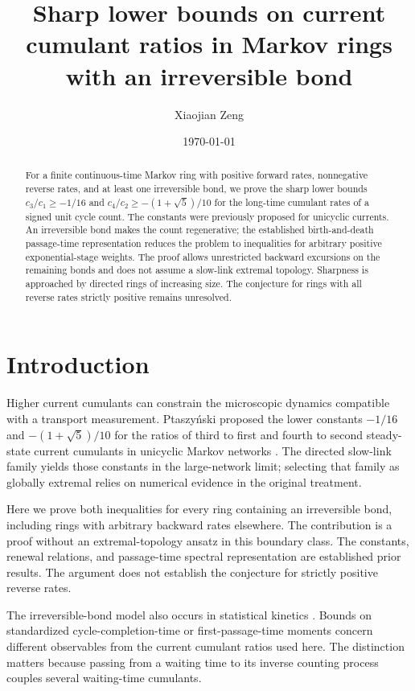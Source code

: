 \documentclass[aps,pre,preprint,superscriptaddress,nofootinbib]{revtex4-2}
\begin{document}
\title{Sharp lower bounds on current cumulant ratios in Markov rings with an irreversible bond}
\author{Xiaojian Zeng}
\date{\today}
\begin{abstract}
For a finite continuous-time Markov ring with positive forward rates, nonnegative reverse rates, and at least one irreversible bond, we prove the sharp lower bounds
$c_3/c_1\geq-1/16$ and $c_4/c_2\geq-(1+\sqrt{5})/10$ for the long-time cumulant rates of a signed unit cycle count.
The constants were previously proposed for unicyclic currents.
An irreversible bond makes the count regenerative; the established birth-and-death passage-time representation reduces the problem to inequalities for arbitrary positive exponential-stage weights.
The proof allows unrestricted backward excursions on the remaining bonds and does not assume a slow-link extremal topology.
Sharpness is approached by directed rings of increasing size.
The conjecture for rings with all reverse rates strictly positive remains unresolved.
\end{abstract}
\maketitle

\section{Introduction}
Higher current cumulants can constrain the microscopic dynamics compatible with a transport measurement. Ptaszy\'nski proposed the lower constants $-1/16$ and $-(1+\sqrt{5})/10$ for the ratios of third to first and fourth to second steady-state current cumulants in unicyclic Markov networks \cite{Ptaszynski2022}. The directed slow-link family yields those constants in the large-network limit; selecting that family as globally extremal relies on numerical evidence in the original treatment.

Here we prove both inequalities for every ring containing an irreversible bond, including rings with arbitrary backward rates elsewhere. The contribution is a proof without an extremal-topology ansatz in this boundary class. The constants, renewal relations, and passage-time spectral representation are established prior results. The argument does not establish the conjecture for strictly positive reverse rates.

The irreversible-bond model also occurs in statistical kinetics \cite{BaratoSeifert2015}. Bounds on standardized cycle-completion-time or first-passage-time moments \cite{BaratoSeifert2015,WamplerBarato2021} concern different observables from the current cumulant ratios used here. The distinction matters because passing from a waiting time to its inverse counting process couples several waiting-time cumulants.
\end{document}
